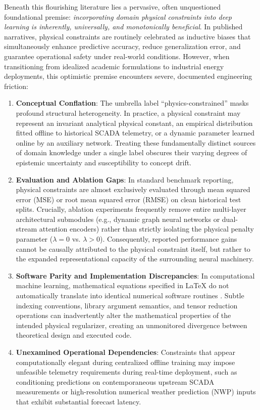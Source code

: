 \documentclass[preprint,3p,times]{elsarticle}
\begin{document}
Beneath this flourishing literature lies a pervasive, often unquestioned foundational premise: \textit{incorporating domain physical constraints into deep learning is inherently, universally, and monotonically beneficial}. In published narratives, physical constraints are routinely celebrated as inductive biases that simultaneously enhance predictive accuracy, reduce generalization error, and guarantee operational safety under real-world conditions. However, when transitioning from idealized academic formulations to industrial energy deployments, this optimistic premise encounters severe, documented engineering friction:
\begin{enumerate}[label=(\roman*)]
    \item \textbf{Conceptual Conflation}: The umbrella label ``physics-constrained'' masks profound structural heterogeneity. In practice, a physical constraint may represent an invariant analytical physical constant, an empirical distribution fitted offline to historical SCADA telemetry, or a dynamic parameter learned online by an auxiliary network. Treating these fundamentally distinct sources of domain knowledge under a single label obscures their varying degrees of epistemic uncertainty and susceptibility to concept drift.
    \item \textbf{Evaluation and Ablation Gaps}: In standard benchmark reporting, physical constraints are almost exclusively evaluated through mean squared error (MSE) or root mean squared error (RMSE) on clean historical test splits. Crucially, ablation experiments frequently remove entire multi-layer architectural submodules (e.g., dynamic graph neural networks or dual-stream attention encoders) rather than strictly isolating the physical penalty parameter ($\lambda=0$ vs. $\lambda > 0$). Consequently, reported performance gains cannot be causally attributed to the physical constraint itself, but rather to the expanded representational capacity of the surrounding neural machinery.
    \item \textbf{Software Parity and Implementation Discrepancies}: In computational machine learning, mathematical equations specified in LaTeX do not automatically translate into identical numerical software routines \cite{kapoor2023,pineau2021}. Subtle indexing conventions, library argument semantics, and tensor reduction operations can inadvertently alter the mathematical properties of the intended physical regularizer, creating an unmonitored divergence between theoretical design and executed code.
    \item \textbf{Unexamined Operational Dependencies}: Constraints that appear computationally elegant during centralized offline training may impose unfeasible telemetry requirements during real-time deployment, such as conditioning predictions on contemporaneous upstream SCADA measurements or high-resolution numerical weather prediction (NWP) inputs that exhibit substantial forecast latency.
\end{enumerate}
\end{document}
